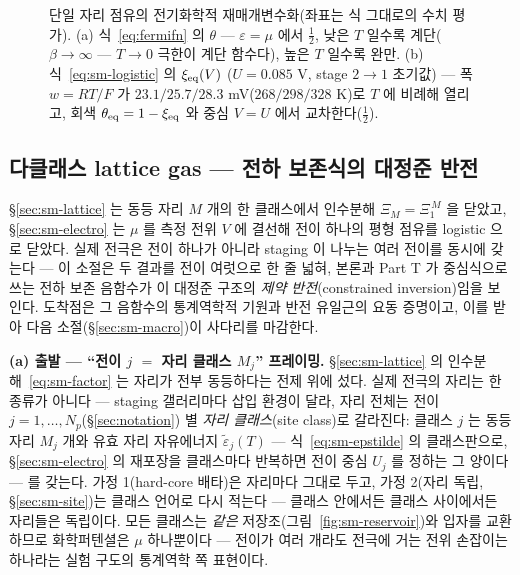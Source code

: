 \begin{figure}[t]
{%
}
\caption{단일 자리 점유의 전기화학적 재매개변수화(좌표는 식 그대로의 수치 평가). (a) 식~\eqref{eq:fermifn} 의
$\theta$ --- $\varepsilon=\mu$ 에서 $\tfrac12$, 낮은 $T$ 일수록 계단($\beta\to\infty$ --- $T\to0$ 극한이
계단 함수다), 높은 $T$ 일수록 완만. (b) 식~\eqref{eq:sm-logistic} 의 $\xi_{\mathrm{eq}}(V)$ ($U=0.085$ V, stage
$2\!\to\!1$ 초기값) --- 폭 $w=RT/F$ 가 $23.1/25.7/28.3$ mV($268/298/328$ K)로 $T$ 에 비례해 열리고, 회색
$\theta_{\mathrm{eq}}=1-\xi_{\mathrm{eq}}$ 와 중심 $V=U$ 에서 교차한다($\tfrac12$).}
\label{fig:sm-occ}
\end{figure}

\subsection{다클래스 lattice gas --- 전하 보존식의 대정준 반전}\label{sec:sm-mc}
\S\ref{sec:sm-lattice} 는 동등 자리 $M$ 개의 한 클래스에서 인수분해 $\Xi_M=\Xi_1^{\,M}$ 을 닫았고,
\S\ref{sec:sm-electro} 는 $\mu$ 를 측정 전위 $V$ 에 결선해 전이 하나의 평형 점유를 logistic 으로 닫았다.
실제 전극은 전이 하나가 아니라 staging 이 나누는 여러 전이를 동시에 갖는다 --- 이 소절은 두 결과를 전이
여럿으로 한 줄 넓혀, 본론과 Part T 가 중심식으로 쓰는 전하 보존 음함수가 이 대정준 구조의
\emph{제약 반전}(constrained inversion)임을 보인다. 도착점은 그 음함수의 통계역학적 기원과 반전 유일근의
요동 증명이고, 이를 받아 다음 소절(\S\ref{sec:sm-macro})이 사다리를 마감한다.

\textbf{(a) 출발 --- ``전이 $j$ $=$ 자리 클래스 $M_j$'' 프레이밍.} \S\ref{sec:sm-lattice} 의
인수분해~\eqref{eq:sm-factor} 는 자리가 전부 동등하다는 전제 위에 섰다. 실제 전극의 자리는 한 종류가 아니다
--- staging 갤러리마다 삽입 환경이 달라, 자리 전체는 전이 $j=1,\dots,N_p$(\S\ref{sec:notation}) 별
\emph{자리 클래스}(site class)로 갈라진다: 클래스 $j$ 는 동등 자리 $M_j$ 개와 유효 자리 자유에너지
$\tilde\varepsilon_j(T)$ --- 식~\eqref{eq:sm-epstilde} 의 클래스판으로, \S\ref{sec:sm-electro} 의 재포장을
클래스마다 반복하면 전이 중심 $U_j$ 를 정하는 그 양이다 --- 를 갖는다. 가정 1(hard-core 배타)은 자리마다
그대로 두고, 가정 2(자리 독립, \S\ref{sec:sm-site})는 클래스 언어로 다시 적는다 --- 클래스 안에서든 클래스
사이에서든 자리들은 독립이다. 모든 클래스는 \emph{같은} 저장조(그림~\ref{fig:sm-reservoir})와 입자를
교환하므로 화학퍼텐셜은 $\mu$ 하나뿐이다 --- 전이가 여러 개라도 전극에 거는 전위 손잡이는 하나라는 실험
구도의 통계역학 쪽 표현이다.

